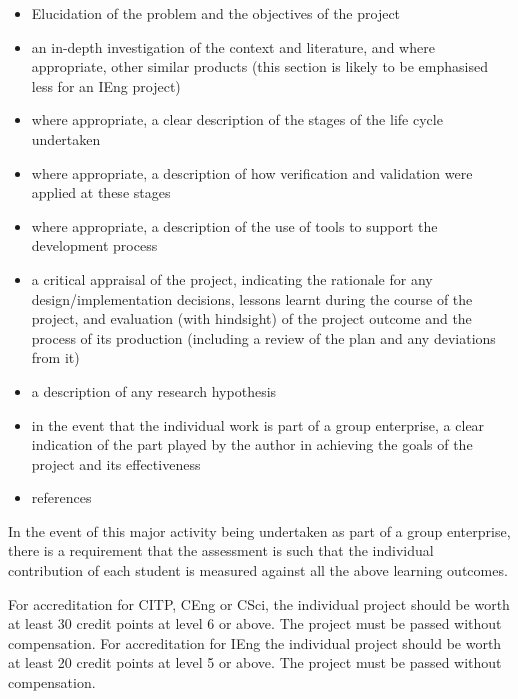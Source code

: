 \documentclass{../fal_assignment}
\begin{document}
\begin{itemize}
\item Elucidation of the problem and the objectives of the project
\item an in-depth investigation of the context and literature, and where appropriate, other similar products (this section is
likely to be emphasised less for an IEng project)
\item where appropriate, a clear description of the stages of the life cycle undertaken
\item where appropriate, a description of how verification and validation were applied at these stages
\item where appropriate, a description of the use of tools to support the development process
\item a critical appraisal of the project, indicating the rationale for any design/implementation decisions, lessons learnt
during the course of the project, and evaluation (with hindsight) of the project outcome and the process of its
production (including a review of the plan and any deviations from it)
\item a description of any research hypothesis
\item in the event that the individual work is part of a group enterprise, a clear indication of the part played by the author in
achieving the goals of the project and its effectiveness
\item references 
\end{itemize}

In the event of this major activity being undertaken as part of a group enterprise, there is a requirement that the
assessment is such that the individual contribution of each student is measured against all the above learning
outcomes.

For accreditation for CITP, CEng or CSci, the individual project should be worth at least 30 credit points at level 6 or
above. The project must be passed without compensation.
For accreditation for IEng the individual project should be worth at least 20 credit points at level 5 or above. The project
must be passed without compensation. 
\end{document}
